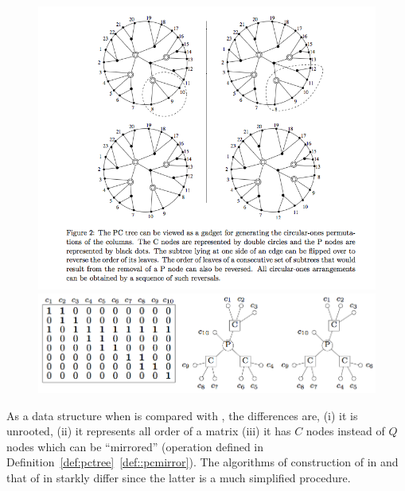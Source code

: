 \begin{figure}[htbp]
  \centering
  \includegraphics[scale=0.4]{../img/pctree_hm03.png}

  \centering
  \includegraphics[scale=0.4]{../img/pctree_dom.png}
  \caption{\figtabsize \PCtree {}}
  \label{fig:pctree}
\end{figure}

As a data structure when \PCtree is compared with \PQtree, the
differences are, (i) it is unrooted, (ii) it represents all \CROP order of a
matrix (iii) it has $C$ nodes instead of $Q$ nodes which can be
``mirrored'' (operation defined in Definition~\ref{def:pctree}~\ref{def::pcmirror}).
The algorithms of construction of \PQtree in \cite{bl76} and that of
\PCtree in \cite{wlh01, hm03} starkly differ since the latter is a
much simplified procedure.




